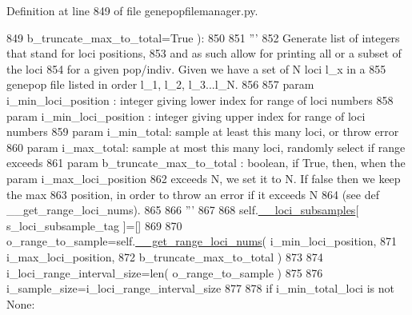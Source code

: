 Definition at line 849 of file genepopfilemanager.\+py.


\begin{DoxyCode}
849             b\_truncate\_max\_to\_total=\textcolor{keyword}{True} ):
850             
851         \textcolor{stringliteral}{'''}
852 \textcolor{stringliteral}{        Generate list of integers that stand for loci positions,}
853 \textcolor{stringliteral}{        and as such allow for printing all or a subset of the loci}
854 \textcolor{stringliteral}{        for a given pop/indiv.  Given we have a set of N loci l\_x in a}
855 \textcolor{stringliteral}{        genepop file listed in order l\_1, l\_2, l\_3...l\_N.}
856 \textcolor{stringliteral}{}
857 \textcolor{stringliteral}{        param i\_min\_loci\_position : integer giving lower index for range of loci numbers}
858 \textcolor{stringliteral}{        param i\_min\_loci\_position : integer giving upper index for range of loci numbers}
859 \textcolor{stringliteral}{        param i\_min\_total: sample at least this many loci, or throw error}
860 \textcolor{stringliteral}{        param i\_max\_total: sample at most this many loci, randomly select if range exceeds}
861 \textcolor{stringliteral}{        param b\_truncate\_max\_to\_total : boolean, if True, then, when the param i\_max\_loci\_position}
862 \textcolor{stringliteral}{                                        exceeds N, we set it to N.  If false then we keep the max}
863 \textcolor{stringliteral}{                                        position, in order to throw an error if it exceeds N}
864 \textcolor{stringliteral}{                                        (see def \_\_get\_range\_loci\_nums).}
865 \textcolor{stringliteral}{}
866 \textcolor{stringliteral}{        '''}
867 
868         self.\hyperlink{classnegui_1_1genepopfilemanager_1_1GenepopFileManager_af867ba70728e8a3aaf0097ddd6399e28}{\_\_loci\_subsamples}[ s\_loci\_subsample\_tag ]=[]
869 
870         o\_range\_to\_sample=self.\hyperlink{classnegui_1_1genepopfilemanager_1_1GenepopFileManager_aaa92e1946fdacb522325a288e00eac71}{\_\_get\_range\_loci\_nums}( i\_min\_loci\_position, 
871                                                             i\_max\_loci\_position,
872                                                             b\_truncate\_max\_to\_total )
873         
874         i\_loci\_range\_interval\_size=len( o\_range\_to\_sample )
875 
876         i\_sample\_size=i\_loci\_range\_interval\_size 
877 
878         \textcolor{keywordflow}{if} i\_min\_total\_loci \textcolor{keywordflow}{is} \textcolor{keywordflow}{not} \textcolor{keywordtype}{None}:

\end{DoxyCode}
